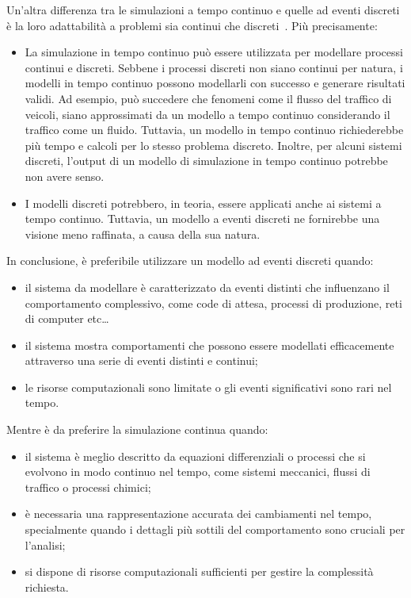 \documentclass[12pt,a4paper,openright,twoside]{book}
\begin{document}
Un'altra differenza tra le simulazioni a tempo continuo e quelle ad eventi discreti è la loro adattabilità a problemi sia continui che discreti~\cite{zgn2009DiscreteVC}. Più precisamente:
\begin{itemize}
    \item La simulazione in tempo continuo può essere utilizzata per modellare processi continui e discreti. Sebbene i processi discreti non siano continui per natura, i modelli in tempo continuo possono modellarli con successo e generare risultati validi. Ad esempio, può succedere che fenomeni come il flusso del traffico di veicoli, siano approssimati da un modello a tempo continuo considerando il traffico come un fluido. Tuttavia, un modello in tempo continuo richiederebbe più tempo e calcoli per lo stesso problema discreto. Inoltre, per alcuni sistemi discreti, l'output di un modello di simulazione in tempo continuo potrebbe non avere senso.
    \item I modelli discreti potrebbero, in teoria, essere applicati anche ai sistemi a tempo continuo. Tuttavia, un modello a eventi discreti ne fornirebbe una visione meno raffinata, a causa della sua natura.
\end{itemize}

In conclusione, è preferibile utilizzare un modello ad eventi discreti quando: 
\begin{itemize}
    \item il sistema da modellare è caratterizzato da eventi distinti che influenzano il comportamento complessivo, come code di attesa, processi di produzione, reti di computer etc\dots
    \item il sistema mostra comportamenti che possono essere modellati efficacemente attraverso una serie di eventi distinti e continui; 
    \item le risorse computazionali sono limitate o gli eventi significativi sono rari nel tempo.
\end{itemize}
Mentre è da preferire la simulazione continua quando: 
\begin{itemize}
    \item il sistema è meglio descritto da equazioni differenziali o processi che si evolvono in modo continuo nel tempo, come sistemi meccanici, flussi di traffico o processi chimici; 
    \item è necessaria una rappresentazione accurata dei cambiamenti nel tempo, specialmente quando i dettagli più sottili del comportamento sono cruciali per l'analisi; 
    \item si dispone di risorse computazionali sufficienti per gestire la complessità richiesta.
\end{itemize}
\end{document}
